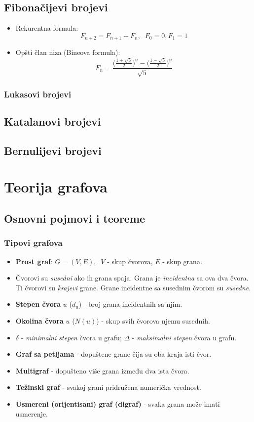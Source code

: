 \documentclass[a4paper,12pt,twoside]{report}
\numberwithin{algorithm}{section}
\begin{document}
\section{Fibonačijevi brojevi}
\begin{itemize}
    \item Rekurentna formula:
    \[
        F_{n + 2} = F_{n + 1} + F_{n}, \;\; F_0 = 0, F_1 = 1
    \]
    \item Opšti član niza (Bineova formula):
    \[
        F_n = \frac{\bigg(\frac{1 + \sqrt{5}}{2}\bigg)^n - \bigg(\frac{1 - \sqrt{5}}{2}\bigg)^n}{\sqrt{5}}
    \]
\end{itemize}
\subsection{Lukasovi brojevi}
\section{Katalanovi brojevi}
\section{Bernulijevi brojevi}
\chapter{Teorija grafova}
\section{Osnovni pojmovi i teoreme}

\subsection{Tipovi grafova}
\begin{itemize}
    \item \textbf{Prost graf}: $G = (V, E),\;\; V $ - skup čvorova, $E$ - skup grana.
    \item Čvorovi su \textit{susedni} ako ih grana spaja. Grana je \textit{incidentna} sa ova dva čvora. Ti čvorovi su \textit{krajevi} grane. Grane incidentne sa susednim čvorom su \textit{susedne}.
    \item \textbf{Stepen čvora} $u$ ($d_u$) - broj grana incidentnih sa njim.
    \item \textbf{Okolina čvora} $u$ ($N(u)$) - skup svih čvorova njemu susednih.
    \item \textbf{$\delta$} - \textit{minimalni stepen} čvora u grafu; \textbf{$\Delta$} - \textit{maksimalni stepen} čvora u grafu.
    \item \textbf{Graf sa petljama} - dopuštene grane čija su oba kraja isti čvor.
    \item \textbf{Multigraf} - dopušteno više grana između dva ista čvora.
    \item \textbf{Težinski graf} - svakoj grani pridružena numerička vrednost.
    \item \textbf{Usmereni (orijentisani) graf (digraf)} - svaka grana može imati usmerenje.
\end{itemize}
\end{document}
